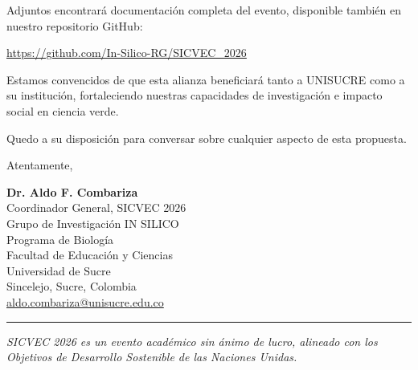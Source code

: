 \documentclass[12pt,a4paper]{article}
\begin{document}
Adjuntos encontrará documentación completa del evento, disponible también en nuestro repositorio GitHub:

\noindent
\url{https://github.com/In-Silico-RG/SICVEC_2026}

\vspace{0.8cm}

Estamos convencidos de que esta alianza beneficiará tanto a UNISUCRE como a su institución, fortaleciendo nuestras capacidades de investigación e impacto social en ciencia verde.

Quedo a su disposición para conversar sobre cualquier aspecto de esta propuesta.

\vspace{1cm}

Atentamente,

\vspace{1cm}

\textbf{Dr. Aldo F. Combariza}\\
Coordinador General, SICVEC 2026\\
Grupo de Investigación IN SILICO\\
Programa de Biología\\
Facultad de Educación y Ciencias\\
Universidad de Sucre\\
Sincelejo, Sucre, Colombia\\
\href{mailto:aldo.combariza@unisucre.edu.co}{aldo.combariza@unisucre.edu.co}

\vspace{0.8cm}

\noindent
\rule{\textwidth}{0.5pt}

\vspace{0.5cm}

\noindent
\textit{\small SICVEC 2026 es un evento académico sin ánimo de lucro, alineado con los Objetivos de Desarrollo Sostenible de las Naciones Unidas.}
\end{document}
